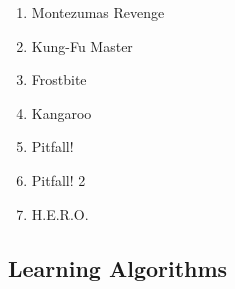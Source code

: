 \documentclass{article}
\begin{document}
\begin{multicols}{2}
\begin{enumerate} [topsep=0pt,itemsep=-1ex,partopsep=1ex,parsep=1ex]
\item Montezumas Revenge
\item Kung-Fu Master
\item Frostbite
\item Kangaroo
\item Pitfall!
\item Pitfall! 2
\item H.E.R.O.
\end{enumerate}
\end{multicols}

\subsection{Learning Algorithms}
\end{document}
